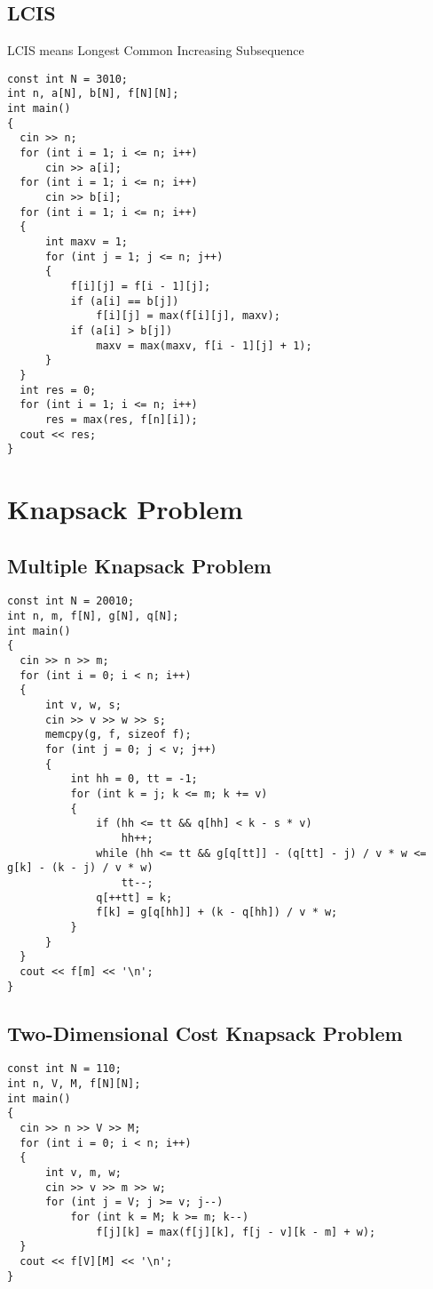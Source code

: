 \subsection{LCIS}
LCIS means Longest Common Increasing Subsequence
\begin{lstlisting}
const int N = 3010;
int n, a[N], b[N], f[N][N];
int main()
{
  cin >> n;
  for (int i = 1; i <= n; i++)
      cin >> a[i];
  for (int i = 1; i <= n; i++)
      cin >> b[i];
  for (int i = 1; i <= n; i++)
  {
      int maxv = 1;
      for (int j = 1; j <= n; j++)
      {
          f[i][j] = f[i - 1][j];
          if (a[i] == b[j])
              f[i][j] = max(f[i][j], maxv);
          if (a[i] > b[j])
              maxv = max(maxv, f[i - 1][j] + 1);
      }
  }
  int res = 0;
  for (int i = 1; i <= n; i++)
      res = max(res, f[n][i]);
  cout << res;
}
\end{lstlisting}
\section{Knapsack Problem}
\subsection{Multiple Knapsack Problem}
\begin{lstlisting}
const int N = 20010;
int n, m, f[N], g[N], q[N];
int main()
{
  cin >> n >> m;
  for (int i = 0; i < n; i++)
  {
      int v, w, s;
      cin >> v >> w >> s;
      memcpy(g, f, sizeof f);
      for (int j = 0; j < v; j++)
      {
          int hh = 0, tt = -1;
          for (int k = j; k <= m; k += v)
          {
              if (hh <= tt && q[hh] < k - s * v)
                  hh++;
              while (hh <= tt && g[q[tt]] - (q[tt] - j) / v * w <= g[k] - (k - j) / v * w)
                  tt--;
              q[++tt] = k;
              f[k] = g[q[hh]] + (k - q[hh]) / v * w;
          }
      }
  }
  cout << f[m] << '\n';
}
\end{lstlisting}
\subsection{Two-Dimensional Cost Knapsack Problem}
\begin{lstlisting}
const int N = 110;
int n, V, M, f[N][N];
int main()
{
  cin >> n >> V >> M;
  for (int i = 0; i < n; i++)
  {
      int v, m, w;
      cin >> v >> m >> w;
      for (int j = V; j >= v; j--)
          for (int k = M; k >= m; k--)
              f[j][k] = max(f[j][k], f[j - v][k - m] + w);
  }
  cout << f[V][M] << '\n';
}
\end{lstlisting}
